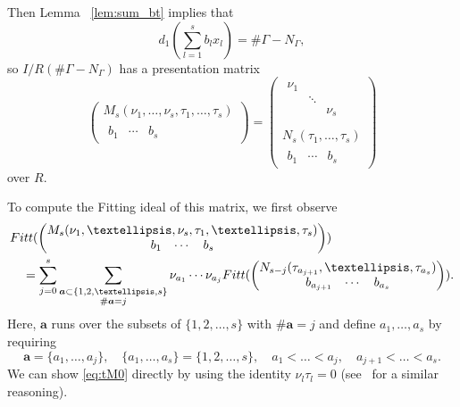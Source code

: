 \documentclass[11pt]{article}
\theoremstyle{definition}
\numberwithin{equation}{section}
\newcommand{\Fitt}{{\rm Fitt}}
\begin{document}
Then Lemma ~\ref{lem:sum_bt} implies that
\[
d_1 \left(\sum_{l=1}^s b_l x_l \right) = \# \Gamma - N_{\Gamma},
\]
so $I/R(\# \Gamma - N_{\Gamma})$ has a presentation matrix
\[
\begin{pmatrix} M_s(\nu_1, \dots, \nu_s, \tau_1, \dots, \tau_s) \\ \begin{matrix} b_1 & \cdots & b_s \end{matrix} \end{pmatrix}
 = \begin{pmatrix} \begin{matrix} \nu_1 & & \\
& \ddots & \\
& & \nu_s \\
\end{matrix}\\
 N_s(\tau_1, \dots, \tau_s) \\
 \begin{matrix} b_1 & \cdots & b_s \end{matrix}
 \end{pmatrix}
\]
over $R$.

To  compute the Fitting ideal of this matrix,
we first observe
\begin{align}\label{eq:tM0}
& \Fitt(
	\begin{pmatrix} 
		M_s(\nu_1, \dots, \nu_s, \tau_1, \dots, \tau_s) \\ \begin{matrix} b_1 & \cdots & b_s \end{matrix}
	\end{pmatrix}
) \\
& \quad = \sum_{j = 0}^s \sum_{\substack{{\bm a} \subset \{1, 2, \dots, s\} \\ \# {\bm a} = j}} \nu_{a_1} \cdots \nu_{a_j} 
\Fitt(
	\begin{pmatrix} N_{s - j}(\tau_{a_{j + 1}}, \dots, \tau_{a_s}) \\ \begin{matrix} b_{a_{j+1}} & \cdots & b_{a_s} \end{matrix}
	\end{pmatrix}
).
\end{align}
Here, $\bm{a}$ runs over the subsets of $\{1, 2, \dots, s\}$ with $\# \bm{a} = j$ and define $a_1, \dots, a_s$ by requiring 
\[
\bm{a} = \{a_1, \dots, a_j\},
\quad \{a_1, \dots, a_s\} = \{1, 2, \dots, s\}, 
\quad a_1 < \dots < a_j, 
\quad a_{j + 1} < \dots < a_s.
\]
We can show \eqref{eq:tM0} directly by using the identity $\nu_l \tau_l = 0$ (see~\cite[Proposition 4.7]{AK21} for a similar reasoning).
\end{document}
